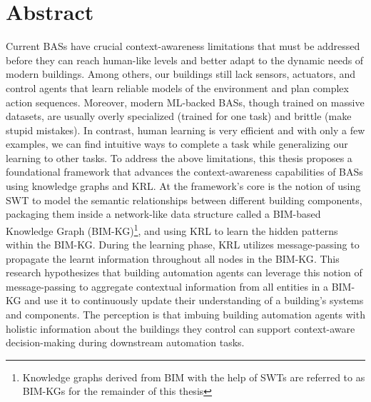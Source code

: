 \chapter*{Abstract}

Current \acp{BAS} have crucial context-awareness limitations that must be addressed before they can reach human-like levels and better adapt to the dynamic needs of modern buildings. Among others, our buildings still lack sensors, actuators, and control agents that learn reliable models of the environment and plan complex action sequences. Moreover, modern \ac{ML}-backed \acp{BAS}, though trained on massive datasets, are usually overly specialized (trained for one task) and brittle (make stupid mistakes). In contrast, human learning is very efficient and with only a few examples, we can find intuitive ways to complete a task while generalizing our learning to other tasks. To address the above limitations, this thesis proposes a foundational framework that advances the context-awareness capabilities of \acp{BAS} using knowledge graphs and \ac{KRL}. At the framework's core is the notion of using \ac{SWT} to model the semantic relationships between different building components, packaging them inside a network-like data structure called a \ac{BIM}-based Knowledge Graph (BIM-KG)\footnote{Knowledge graphs derived from \ac{BIM} with the help of \acp{SWT} are referred to as \acp{BIM-KG} for the remainder of this thesis}, and using \ac{KRL} to learn the hidden patterns within the \ac{BIM-KG}. During the learning phase, \ac{KRL} utilizes message-passing to propagate the learnt information throughout all nodes in the \ac{BIM-KG}. This research hypothesizes that building automation agents can leverage this notion of message-passing to aggregate contextual information from all entities in a \ac{BIM-KG} and use it to continuously update their understanding of a building's systems and components. The perception is that imbuing building automation agents with holistic information about the buildings they control can support context-aware decision-making during downstream automation tasks.

